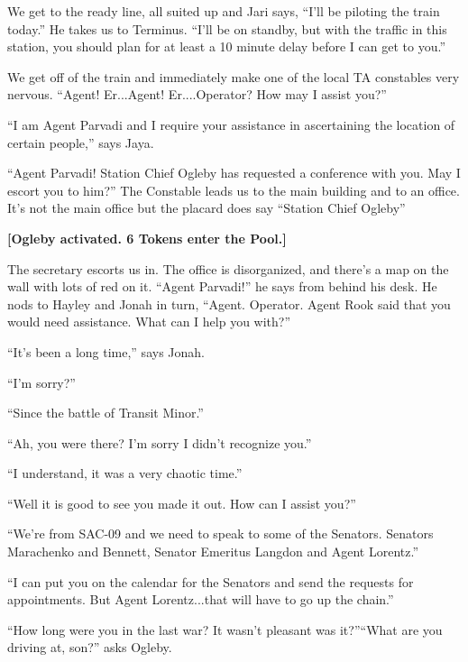 
We get to the ready line, all suited up and Jari says, ``I'll be piloting the train today.''  He takes us to Terminus.  ``I'll be on standby, but with the traffic in this station, you should plan for at least a 10 minute delay before I can get to you.''



We get off of the train and immediately make one of the local TA constables very nervous.  ``Agent!  Er...Agent!  Er....Operator?  How may I assist you?''

``I am Agent Parvadi and I require your assistance in ascertaining the location of certain people,'' says Jaya.

``Agent Parvadi!  Station Chief Ogleby has requested a conference with you.  May I escort you to him?''  The Constable leads us to the main building and to an office. It's not the main office but the placard does say ``Station Chief Ogleby''



\textbf{{[}Ogleby activated.  6 Tokens enter the Pool.{]}}



The secretary escorts us in.  The office is disorganized, and there's a map on the wall with lots of red on it.  ``Agent Parvadi!'' he says from behind his desk.  He nods to Hayley and Jonah in turn, ``Agent.  Operator.  Agent Rook said that you would need assistance.  What can I help you with?''

``It's been a long time,'' says Jonah.

``I'm sorry?''

``Since the battle of Transit Minor.'' 

``Ah, you were there?  I'm sorry I didn't recognize you.''

``I understand, it was a very chaotic time.''

``Well it is good to see you made it out.  How can I assist you?''

``We're from SAC-09 and we need to speak to some of the Senators.  Senators Marachenko and Bennett, Senator Emeritus Langdon and Agent Lorentz.''

``I can put you on the calendar for the Senators and send the requests for appointments.  But Agent Lorentz...that will have to go up the chain.''

``How long were you in the last war?  It wasn't pleasant was it?''``What are you driving at, son?'' asks Ogleby.

